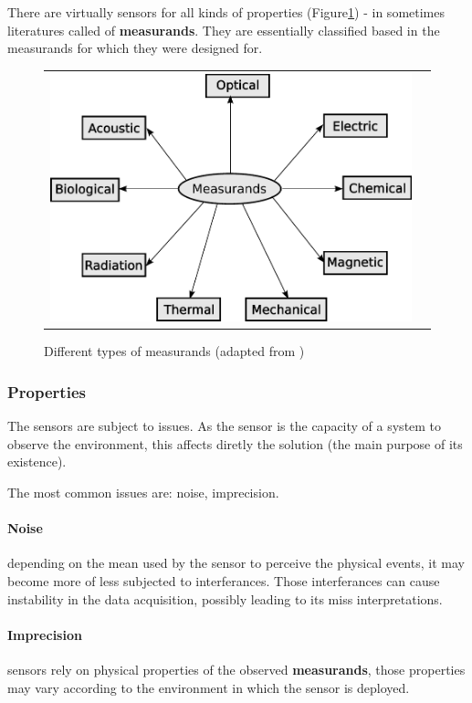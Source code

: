 There are virtually sensors for all kinds of properties (Figure\ref{fig:sensors}) - in sometimes literatures called of \textbf{measurands}. They are essentially classified based in the measurands for which they were designed for.

\begin{figure}[h]
   \centering
     \begin{tabular}{lr}
       \includegraphics[scale=0.50]{img/fig:sensors}
     \end{tabular}
   \caption{Different types of measurands (adapted from \cite{WhiteRichard})}
   \label{fig:sensors}
 \end{figure}

\subsubsection{Properties}

The sensors are subject to issues. As the sensor is the capacity of a system to observe the environment, this affects diretly the solution (the main purpose of its existence).

The most common issues are: noise, imprecision. 

\paragraph{Noise} depending on the mean used by the sensor to perceive the physical events, it may become more of less subjected to interferances. Those interferances can cause instability in the data acquisition, possibly leading to its miss interpretations.

\paragraph{Imprecision} sensors rely on physical properties of the observed \textbf{measurands}, those properties may vary according to the environment in which the sensor is deployed.

